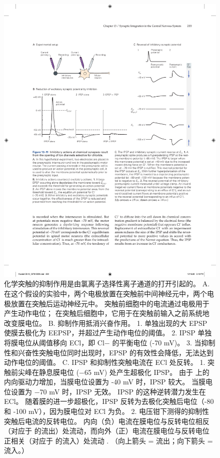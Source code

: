 \begin{figure}[htbp]
	\centering
	\includegraphics[width=0.95\linewidth]{chap13/fig_13_11}
	\caption{化学突触的抑制作用是由氯离子选择性离子通道的打开引起的。 A. 在这个假设的实验中，两个电极放置在突触前中间神经元中，两个电极放置在突触后运动神经元中。 突触前细胞中的电流通过电极用于产生动作电位； 在突触后细胞中，它用于在突触前输入之前系统地改变膜电位。 B. 抑制作用抵消兴奋作用。 1. 单独出现的大 EPSP 使膜去极化为 EEPSP，并超过产生动作电位的阈值。 2. IPSP 单独将膜电位从阈值移向 ECl，即 Cl− 的平衡电位 (-70 mV)。 3. 当抑制性和兴奋性突触电位同时出现时，EPSP 的有效性会降低，无法达到动作电位的阈值。 C. IPSP 和抑制性突触电流在 ECl 处反转。 1. 突触前尖峰在静息膜电位 (−65 mV) 处产生超极化 IPSP。 由于  上的内向驱动力增加，当膜电位设置为 -40 mV 时，IPSP 较大。 当膜电位设置为 −70 mV 时，IPSP 无效。 IPSP 的这种逆转潜力发生在 ECl。 随着膜的进一步超极化，IPSP 反转为去极化突触后电位（-80 和 -100 mV），因为膜电位对 ECl 为负。 2. 电压钳下测得的抑制性突触后电流的反转电位。 内向（负）电流在膜电位与反转电位相反（对应于  的流出）处流动，而向外（正）电流在膜电位与反转电位正相关（对应于  的流入）处流动 . （向上箭头 = 流出；向下箭头 = 流入。）}
	\label{fig:13_11}
\end{figure}


